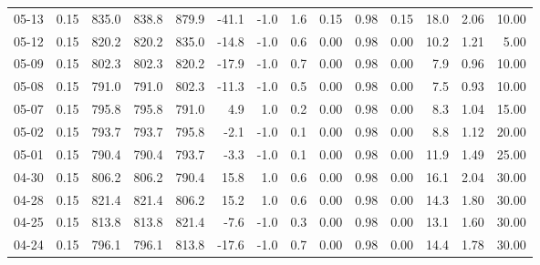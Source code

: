 \begin{threeparttable}
{\begin{tabular}{lrrrrrrrrrrrrr}
  05-13 &     0.15 & 835.0 & 838.8 & 879.9 &      -41.1 &                     -1.0 &                 1.6 &       0.15 &      0.98 &           0.15 &             18.0 &            2.06 &                  10.00 \\
  05-12 &     0.15 & 820.2 & 820.2 & 835.0 &      -14.8 &                     -1.0 &                 0.6 &       0.00 &      0.98 &           0.00 &             10.2 &            1.21 &                   5.00 \\
  05-09 &     0.15 & 802.3 & 802.3 & 820.2 &      -17.9 &                     -1.0 &                 0.7 &       0.00 &      0.98 &           0.00 &              7.9 &            0.96 &                  10.00 \\
  05-08 &     0.15 & 791.0 & 791.0 & 802.3 &      -11.3 &                     -1.0 &                 0.5 &       0.00 &      0.98 &           0.00 &              7.5 &            0.93 &                  10.00 \\
  05-07 &     0.15 & 795.8 & 795.8 & 791.0 &        4.9 &                      1.0 &                 0.2 &       0.00 &      0.98 &           0.00 &              8.3 &            1.04 &                  15.00 \\
  05-02 &     0.15 & 793.7 & 793.7 & 795.8 &       -2.1 &                     -1.0 &                 0.1 &       0.00 &      0.98 &           0.00 &              8.8 &            1.12 &                  20.00 \\
  05-01 &     0.15 & 790.4 & 790.4 & 793.7 &       -3.3 &                     -1.0 &                 0.1 &       0.00 &      0.98 &           0.00 &             11.9 &            1.49 &                  25.00 \\
  04-30 &     0.15 & 806.2 & 806.2 & 790.4 &       15.8 &                      1.0 &                 0.6 &       0.00 &      0.98 &           0.00 &             16.1 &            2.04 &                  30.00 \\
  04-28 &     0.15 & 821.4 & 821.4 & 806.2 &       15.2 &                      1.0 &                 0.6 &       0.00 &      0.98 &           0.00 &             14.3 &            1.80 &                  30.00 \\
  04-25 &     0.15 & 813.8 & 813.8 & 821.4 &       -7.6 &                     -1.0 &                 0.3 &       0.00 &      0.98 &           0.00 &             13.1 &            1.60 &                  30.00 \\
  04-24 &     0.15 & 796.1 & 796.1 & 813.8 &      -17.6 &                     -1.0 &                 0.7 &       0.00 &      0.98 &           0.00 &             14.4 &            1.78 &                  30.00 \\

\end{tabular}}
\end{threeparttable}
